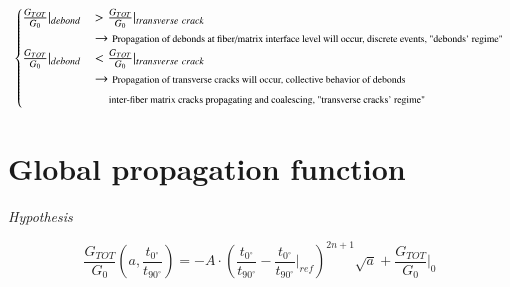 \documentclass[review]{elsarticle}
\begin{document}
\begin{equation}
\begin{cases}
\frac{G_{TOT}}{G_{0}}|_{debond}&>\frac{G_{TOT}}{G_{0}}|_{transverse\ crack}\\ &\rightarrow\text{\scriptsize Propagation of debonds at fiber/matrix interface level will occur, discrete events, "debonds' regime"}\\
\frac{G_{TOT}}{G_{0}}|_{debond}&<\frac{G_{TOT}}{G_{0}}|_{transverse\ crack}\\ &\rightarrow\text{\scriptsize Propagation of transverse cracks will occur, collective behavior of debonds}\\
&\quad\text{\scriptsize inter-fiber matrix cracks propagating and coalescing, "transverse cracks' regime"}\\
\end{cases}
\end{equation}

\section{Global propagation function}

\em{Hypothesis}

\begin{equation}
\frac{G_{TOT}}{G_{0}}\left(a,\frac{t_{0^{\circ}}}{t_{90^{\circ}}}\right)=-A\cdot\left(\frac{t_{0^{\circ}}}{t_{90^{\circ}}}-\frac{t_{0^{\circ}}}{t_{90^{\circ}}}|_{ref}\right)^{2n+1}\sqrt{a}+\frac{G_{TOT}}{G_{0}}|_{0}
\end{equation}
\end{document}
